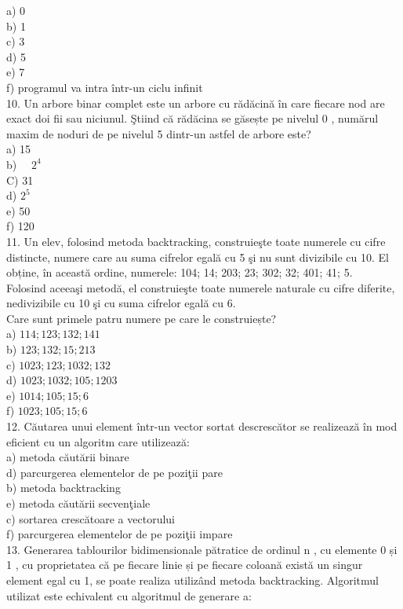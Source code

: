 a) 0\\
b) 1\\
c) 3\\
d) 5\\
e) 7\\
f) programul va intra într-un ciclu infinit\\
10. Un arbore binar complet este un arbore cu rădăcină în care fiecare nod are exact doi fii sau niciunul. Ştiind că rădăcina se găsește pe nivelul 0 , numărul maxim de noduri de pe nivelul 5 dintr-un astfel de arbore este?\\
a) 15\\
b) $\quad 2^{4}$\\
C) 31\\
d) $2^{5}$\\
e) 50\\
f) 120\\
11. Un elev, folosind metoda backtracking, construieşte toate numerele cu cifre distincte, numere care au suma cifrelor egală cu 5 şi nu sunt divizibile cu 10. El obține, în această ordine, numerele: 104; 14; 203; 23; 302; 32; 401; 41; 5.\\
Folosind aceeaşi metodă, el construieşte toate numerele naturale cu cifre diferite, nedivizibile cu 10 şi cu suma cifrelor egală cu 6.\\
Care sunt primele patru numere pe care le construiește?\\
a) $114 ; 123 ; 132 ; 141$\\
b) $123 ; 132 ; 15 ; 213$\\
c) $1023 ; 123 ; 1032 ; 132$\\
d) $1023 ; 1032 ; 105 ; 1203$\\
e) $1014 ; 105 ; 15 ; 6$\\
f) $1023 ; 105 ; 15 ; 6$\\
12. Căutarea unui element într-un vector sortat descrescător se realizează în mod eficient cu un algoritm care utilizează:\\
a) metoda căutării binare\\
d) parcurgerea elementelor de pe poziţii pare\\
b) metoda backtracking\\
e) metoda căutării secvenţiale\\
c) sortarea crescătoare a vectorului\\
f) parcurgerea elementelor de pe poziţii impare\\
13. Generarea tablourilor bidimensionale pătratice de ordinul n , cu elemente 0 și 1 , cu proprietatea că pe fiecare linie și pe fiecare coloană există un singur element egal cu 1, se poate realiza utilizând metoda backtracking. Algoritmul utilizat este echivalent cu algoritmul de generare a:\\
